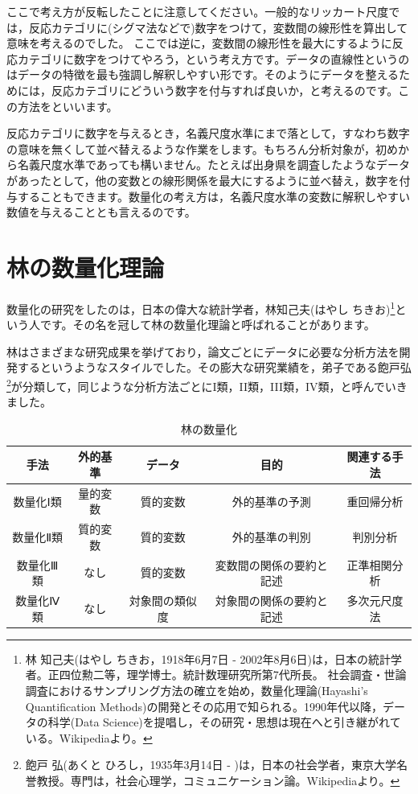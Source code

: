 \documentclass{ltjsbook}
\begin{document}
ここで考え方が反転したことに注意してください。一般的なリッカート尺度では，反応カテゴリに(シグマ法などで)数字をつけて，変数間の線形性を算出して意味を考えるのでした。
ここでは逆に，変数間の線形性を最大にするように反応カテゴリに数字をつけてやろう，という考え方です。データの直線性というのはデータの特徴を最も強調し解釈しやすい形です。そのようにデータを整えるためには，反応カテゴリにどういう数字を付与すれば良いか，と考えるのです。この方法をといいます。

反応カテゴリに数字を与えるとき，名義尺度水準にまで落として，すなわち数字の意味を無くして並べ替えるような作業をします。もちろん分析対象が，初めから名義尺度水準であっても構いません。たとえば出身県を調査したようなデータがあったとして，他の変数との線形関係を最大にするように並べ替え，数字を付与することもできます。数量化の考え方は，名義尺度水準の変数に解釈しやすい数値を与えることとも言えるのです。

\section{林の数量化理論}
数量化の研究をしたのは，日本の偉大な統計学者，林知己夫(はやし ちきお)\footnote{林 知己夫(はやし ちきお，1918年6月7日 - 2002年8月6日)は，日本の統計学者。正四位勲二等，理学博士。統計数理研究所第7代所長。 社会調査・世論調査におけるサンプリング方法の確立を始め，数量化理論(Hayashi's Quantification Methods)の開発とその応用で知られる。1990年代以降，データの科学(Data Science)を提唱し，その研究・思想は現在へと引き継がれている。Wikipediaより。}という人です。その名を冠して林の数量化理論と呼ばれることがあります。

林はさまざまな研究成果を挙げており，論文ごとにデータに必要な分析方法を開発するというようなスタイルでした。その膨大な研究業績を，弟子である飽戸弘\footnote{飽戸 弘(あくと ひろし，1935年3月14日 - )は，日本の社会学者，東京大学名誉教授。専門は，社会心理学，コミュニケーション論。Wikipediaより。}が分類して，同じような分析方法ごとにI類，II類，III類，IV類，と呼んでいきました。

\begin{table}[ht]
	\caption{林の数量化}
	\begin{tabular}{c|c|c|c|c}
		手法    & 外的基準 & データ     & 目的           & 関連する手法 \\
		\hline
		数量化Ⅰ類 & 量的変数 & 質的変数    & 外的基準の予測      & 重回帰分析  \\
		数量化Ⅱ類 & 質的変数 & 質的変数    & 外的基準の判別      & 判別分析   \\
		数量化Ⅲ類 & なし   & 質的変数    & 変数間の関係の要約と記述 & 正準相関分析 \\
		数量化Ⅳ類 & なし   & 対象間の類似度 & 対象間の関係の要約と記述 & 多次元尺度法 \\
	\end{tabular}
	\label{tbl:14_03}
\end{table}
\end{document}
